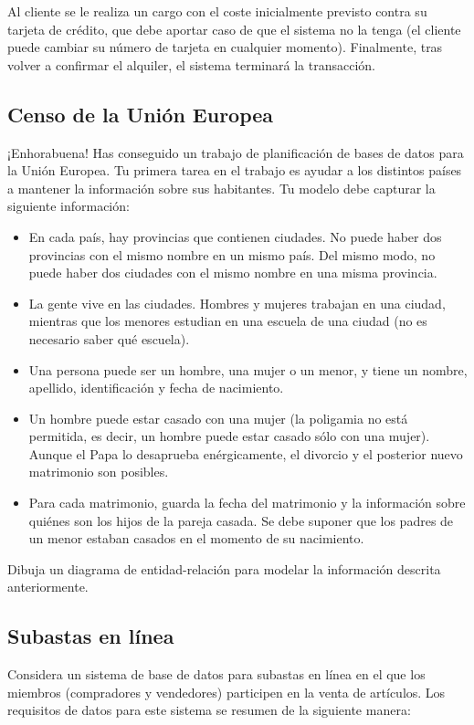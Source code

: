 \documentclass{db-practice}
\begin{document}
Al cliente se le realiza un cargo con el coste inicialmente previsto contra su tarjeta de crédito, que debe aportar caso de que el sistema no la tenga (el cliente puede cambiar su número de tarjeta en cualquier momento). Finalmente, tras volver a confirmar el alquiler, el sistema terminará la transacción.

\subsection{Censo de la Unión Europea}
¡Enhorabuena! Has conseguido un trabajo de planificación de bases de datos para la Unión Europea. Tu primera tarea en el trabajo es ayudar a los distintos países a mantener la información sobre sus habitantes. Tu modelo debe capturar la siguiente información:

\begin{itemize}
    \item En cada país, hay provincias que contienen ciudades. No puede haber dos provincias con el mismo nombre en un mismo país. Del mismo modo, no puede haber dos ciudades con el mismo nombre en una misma provincia.
    \item La gente vive en las ciudades. Hombres y mujeres trabajan en una ciudad, mientras que los menores estudian en una escuela de una ciudad (no es necesario saber qué escuela).
    \item Una persona puede ser un hombre, una mujer o un menor, y tiene un nombre, apellido, identificación y fecha de nacimiento.
    \item Un hombre puede estar casado con una mujer (la poligamia no está permitida, es decir, un hombre puede estar casado sólo con una mujer). Aunque el Papa lo desaprueba enérgicamente, el divorcio y el posterior nuevo matrimonio son posibles.
    \item Para cada matrimonio, guarda la fecha del matrimonio y la información sobre quiénes son los hijos de la pareja casada. Se debe suponer que los padres de un menor estaban casados en el momento de su nacimiento.
\end{itemize}

Dibuja un diagrama de entidad-relación para modelar la información descrita anteriormente.

\subsection{Subastas en línea}

Considera un sistema de base de datos para subastas en línea en el que los miembros (compradores y vendedores) participen en la venta de artículos. Los requisitos de datos para este sistema se resumen de la siguiente manera: 
\end{document}
